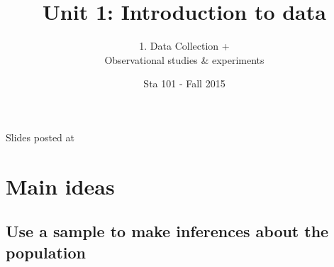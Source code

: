\documentclass[slidestop,compress,mathserif,12pt,t,professionalfonts,xcolor=table]{beamer}
\title{Unit 1: Introduction to data}
\subtitle{1. Data Collection +\\Observational studies \& experiments}
\author{Sta 101 - Fall 2015}
\author{\CourseName}
\date{}
\institute{\InstituteName}
\begin{document}



\begin{frame}[plain]

\titlepage

\vfill

{\scriptsize {} \hfill Slides posted at  \webURL{\CourseSite}}

\addtocounter{framenumber}{-1} 

\end{frame}


\section{Main ideas}


\subsection{Use a sample to make inferences about the population}
\label{mi1}

\end{document}
